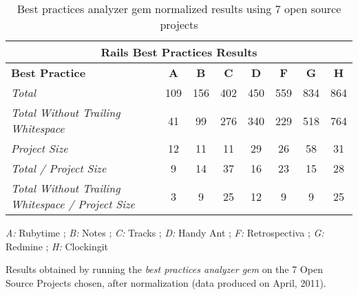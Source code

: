 \begin{table}[H]
\begin{center}
{\scriptsize
\begin{threeparttable}
\begin{tabular}{|l||c|c|c|c|c|c|c|} \hline
\multicolumn{8}{|c|}{Rails Best Practices Results} \\ \hline
\textbf{Best Practice}& \textbf{A}& \textbf{B}& \textbf{C}&  \textbf{D}& \textbf{F}& \textbf{G}& \textbf{H} \\\hline\hline
\emph{Total                                           }              & 109  & 156  & 402  & 450 & 559 & 834 & 864  \\ \hline
\emph{Total Without Trailing Whitespace               }              &  41  &  99  & 276  & 340 & 229 & 518 & 764  \\ \hline
\emph{Project Size                                    }              &  12  &  11  &  11  &  29 &  26 &  58 &  31  \\ \hline
\emph{Total / Project Size                            }              &   9  &  14  &  37  &  16 &  23 &  15 &  28  \\ \hline
\emph{Total Without Trailing Whitespace / Project Size}              &   3  &   9  &  25  &  12 &   9 &   9 &  25  \\ \hline
\end{tabular}
\begin{tablenotes}
  \item \emph{A:} Rubytime
  ; \emph{B:} Notes
  ; \emph{C:} Tracks
  ; \emph{D:} Handy Ant
  ; \emph{F:} Retrospectiva
  ; \emph{G:} Redmine
  ; \emph{H:} Clockingit
  \item Results obtained by running the \emph{best practices analyzer gem} on the 7 Open Source Projects chosen, 
        after normalization (data produced on April, 2011).
\end{tablenotes}
\end{threeparttable}
}
\end{center}
\caption{Best practices analyzer gem normalized results using 7 open source projects}
\label{tab:rbpresults_1}
\end{table}